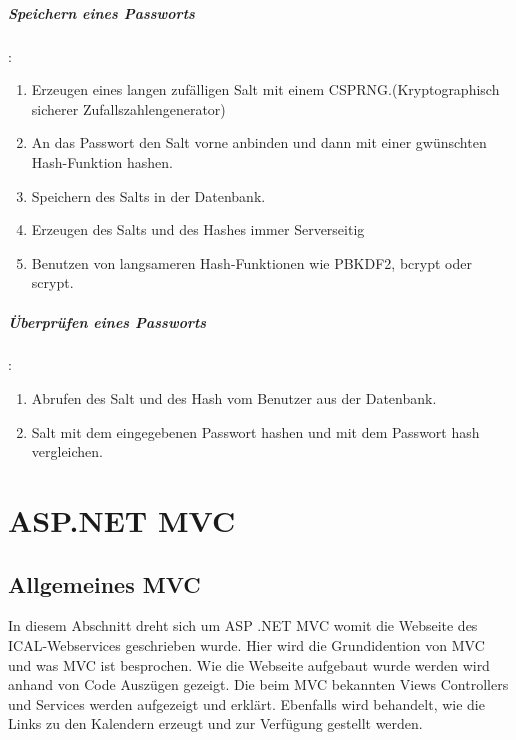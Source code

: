{\paragraph{Speichern eines Passworts}:\\
\begin{enumerate}
\item Erzeugen eines langen zufälligen Salt mit einem CSPRNG.(Kryptographisch sicherer Zufallszahlengenerator) 
\item An das Passwort den Salt vorne anbinden und dann mit einer gwünschten Hash-Funktion hashen.
\item Speichern des Salts in der Datenbank.
\item Erzeugen des Salts und des Hashes immer Serverseitig
\item Benutzen von langsameren Hash-Funktionen wie  PBKDF2, bcrypt oder scrypt.
\end{enumerate}
\paragraph{Überprüfen eines Passworts}:\\
\begin{enumerate}
\item Abrufen des Salt und des Hash vom Benutzer aus der Datenbank.
\item Salt mit dem eingegebenen Passwort hashen und mit dem Passwort hash vergleichen.
\end{enumerate}
\chapter{ASP.NET MVC}
\label{sec:MVC}
\section{Allgemeines MVC}
\label{sec:allgemein}
In diesem Abschnitt dreht sich um ASP .NET MVC womit die Webseite des ICAL-Webservices geschrieben wurde. Hier wird die Grundidention von MVC und was MVC ist besprochen. Wie die Webseite aufgebaut wurde werden wird anhand von Code Auszügen gezeigt. Die beim MVC bekannten Views Controllers und Services werden aufgezeigt und erklärt. Ebenfalls wird behandelt, wie die Links zu den Kalendern erzeugt und zur Verfügung gestellt werden. 
}
